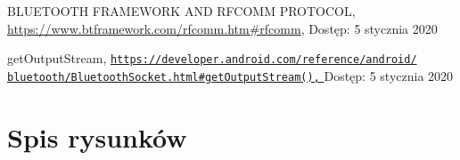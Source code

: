 \documentclass[a4paper,12pt, twoside]{article}
\begin{document}
\begin{thebibliography}{}
    		BLUETOOTH FRAMEWORK AND RFCOMM PROTOCOL,
    		\newline\url{https://www.btframework.com/rfcomm.htm#rfcomm}, 
    		\newline Dostęp: 5 stycznia 2020
    		
    		getOutputStream,
    		\newline\href{https://developer.android.com/reference/android/bluetooth/BluetoothSocket.html\#getOutputStream()}
    		 {\nolinkurl{https://developer.android.com/reference/android/}
                 \\
                  \nolinkurl{bluetooth/BluetoothSocket.html\#getOutputStream(),}
                 }
    		\newline Dostęp: 5 stycznia 2020
    		
    	\end{thebibliography}
    	\endgroup
    	
    	\newpage
    	\section{Spis rysunków}
    	\begingroup
    	\renewcommand{\section}[2]{}%
    	\listoffigures
    	\endgroup
    	
    	\newpage
    	\section{Spis algorytmów}
    	\begingroup
    	\renewcommand{\section}[2]{}%
    	\lstlistoflistings
    	\renewcommand{\section}[2]{}%
    	\endgroup
    	
    
\end{document}
